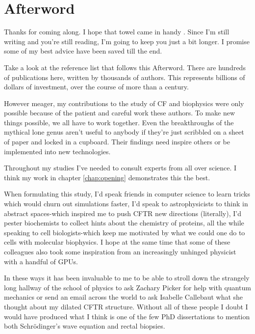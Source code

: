 \chapter{Afterword}
\label{chap:Afterword}
\chapquote {}{}

Thanks for coming along. I hope that towel came in handy \cite{adamd1979}. Since I'm still writing and you're still reading, I'm going to keep you just a bit longer. I promise some of my best advice have been saved till the end. 

Take a look at the reference list that follows this Afterword. There are hundreds of publications here, written by thousands of authors. This represents billions of dollars of investment, over the course of more than a century. 

However meager, my contributions to the study of CF and biophysics were only possible because of the patient and careful work these authors. To make new things possible, we all have to work together. Even the breakthroughs of the mythical lone genus aren't useful to anybody if they're just scribbled on a sheet of paper and locked in a cupboard. Their findings need inspire others or be implemented into new technologies.

Throughout my studies I've needed to consult experts from all over science. I think my work in chapter \ref{chap:opening} demonstrates this the best. 

When formulating this study, I'd speak friends in computer science to learn tricks which would churn out simulations faster, I'd speak to astrophysicists to think in abstract spaces-which inspired me to push CFTR new directions (literally), I'd pester biochemists to collect hints about the chemistry of proteins, all the while speaking to cell biologists-which keep me motivated by what we could one do to cells with molecular biophysics. I hope at the same time that some of these colleagues also took some inspiration from an increasingly unhinged physicist with a handful of GPUs. 

In these ways it has been invaluable to me to be able to stroll down the strangely long hallway of the school of physics to ask Zachary Picker for help with quantum mechanics or send an email across the world to ask Isabelle Callebaut what she thought about my dilated CFTR structure. Without all of these people I doubt I would have produced what I think is one of the few PhD dissertations to mention both Schr\"odinger's wave equation and rectal biopsies. 

